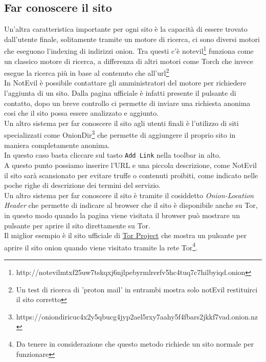 \subsection{Far conoscere il sito}
Un'altra caratteristica importante per ogni sito è la capacità di essere trovato dall'utente finale, solitamente tramite un motore di ricerca, ci sono diversi motori che eseguono l'indexing di indirizzi onion. Tra questi c'è notevil\footnote{http://notevilmtxf25uw7tskqxj6njlpebyrmlrerfv5hc4tuq7c7hilbyiqd.onion} funziona come un classico motore di ricerca, a differenza di altri motori come Torch che invece esegue la ricerca più in base al contenuto che all'url\footnote{Un test di ricerca di 'proton mail' in entrambi mostra solo notEvil restituirci il sito corretto} \\
In NotEvil è possibile contattare gli amministratori del motore per richiedere l'aggiunta di un sito. 
Dalla pagina ufficiale è infatti presente il pulsante di contatto, dopo un breve controllo ci permette di inviare una richiesta anonima cosi che il sito possa essere analizzato e aggiunto. \\
Un altro sistema per far conoscere il sito agli utenti finali è l'utilizzo di siti specializzati come OnionDir\footnote{https://oniondiricuc4x2y5qbucg4jyp2ael5rxy7aahy5f4fbars2jkkf7vad.onion.nz} che permette di aggiungere il proprio sito in maniera completamente anonima. \\
In questo caso basta cliccare sul tasto \lstinline{Add Link} nella toolbar in alto. \\
A questo punto possiamo inserire l'URL e una piccola descrizione, come NotEvil il sito sarà scansionato per evitare truffe o contenuti proibiti, come indicato nelle poche righe di descrizione dei termini del servizio. \\
\newpage
Un altro sistema per far conoscere il sito è tramite il cosiddetto \emph{Onion-Location Header} che permette di indicare al browser che il sito è disponibile anche su Tor, in questo modo quando la pagina viene visitata il browser può mostrare un pulsante per aprire il sito direttamente su Tor. \\
Il miglior esempio è il sito ufficiale di \href{www.torproject.org}{Tor Project} che mostra un pulsante per aprire il sito onion quando viene visitato tramite la rete Tor\footnote{Da tenere in considerazione che questo metodo richiede un sito normale per funzionare}. \\

